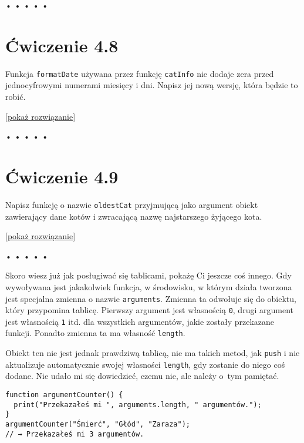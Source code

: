   
  
\begin{center}
• • • • •
\end{center}
  
    
\section*{Ćwiczenie 4.8}
\label{sec:4.8}
    
      
Funkcja \texttt{formatDate} używana przez funkcję \texttt{catInfo} nie dodaje zera przed jednocyfrowymi numerami miesięcy i dni. Napisz jej nową wersję, która będzie to robić.

    
[\hyperref[sol:4.8]{pokaż rozwiązanie}]
    
  
\begin{center}
• • • • •
\end{center}
  
    
\section*{Ćwiczenie 4.9}
\label{sec:4.9}
    
      
Napisz funkcję o nazwie \texttt{oldestCat} przyjmującą jako argument obiekt zawierający dane kotów i zwracającą nazwę najstarszego żyjącego kota.

    
[\hyperref[sol:4.9]{pokaż rozwiązanie}] 
  
  
\begin{center}
• • • • •
\end{center}
  
    
Skoro wiesz już jak posługiwać się tablicami, pokażę Ci jeszcze coś innego. Gdy wywoływana jest jakakolwiek funkcja, w środowisku, w którym działa tworzona jest specjalna zmienna o nazwie \texttt{arguments}. Zmienna ta odwołuje się do obiektu, który przypomina tablicę. Pierwszy argument jest własnością \texttt{0}, drugi argument jest własnością \texttt{1} itd. dla wszystkich argumentów, jakie zostały przekazane funkcji. Ponadto zmienna ta ma własność \texttt{length}.

    
Obiekt ten nie jest jednak prawdziwą tablicą, nie ma takich metod, jak \texttt{push} i nie aktualizuje automatycznie swojej własności \texttt{length}, gdy zostanie do niego coś dodane. Nie udało mi się dowiedzieć, czemu nie, ale należy o~tym pamiętać.

    
\begin{verbatim} 
function argumentCounter() {
  print("Przekazałeś mi ", arguments.length, " argumentów.");
}
argumentCounter("Śmierć", "Głód", "Zaraza");
// → Przekazałeś mi 3 argumentów.
\end{verbatim}
    
